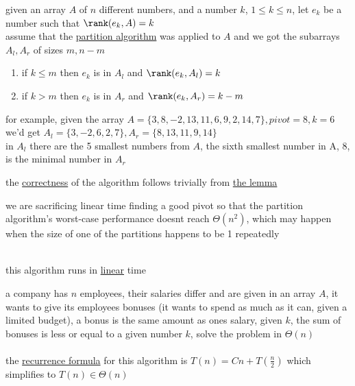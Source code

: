 \documentclass[a4paper,12pt]{article}
\begin{document}
\begin{lemma}
given an array \(A\) of \(n\) different numbers, and a number \(k\), \(1 \le k \le n\), let \(e_k\) be a number such that \(\rank(e_k,A)=k\)\\[0pt]
assume that the \href{20230202201612-partition_algorithm.org}{partition algorithm} was applied to \(A\) and we got the subarrays \(A_l,A_r\) of sizes \(m,n-m\)\\[0pt]
\begin{enumerate}
\item if \(k \le m\) then \(e_k\) is in \(A_l\) and \(\rank(e_k,A_l)=k\)\\[0pt]
\item if \(k>m\) then \(e_k\) is in \(A_r\) and \(\rank(e_k,A_r)=k-m\)\\[0pt]
\end{enumerate}
for example, given the array \(A=\{3,8,-2,13,11,6,9,2,14,7\},pivot=8,k=6\)\\[0pt]
we'd get \(A_l=\{3,-2,6,2,7\},A_r=\{8,13,11,9,14\}\)\\[0pt]
in \(A_l\) there are the 5 smallest numbers from \(A\), the sixth smallest number in A, 8, is the minimal number in \(A_r\)\\[0pt]
\label{orgec13148}
\end{lemma}
the \href{20221104220603-algorithm_correctness.org}{correctness} of the algorithm follows trivially from \hyperref[orgec13148]{the lemma}\\[0pt]
\begin{note}
we are sacrificing linear time finding a good pivot so that the partition algorithm's worst-case performance doesnt reach \(\Theta(n^2)\), which may happen when the size of one of the partitions happens to be 1 repeatedly\\[0pt]
\end{note}
\begin{my_example}
\\[0pt]

this algorithm runs in \href{calculus2.org}{linear} time\\[0pt]
\end{my_example}
\begin{my_example}
a company has \(n\) employees, their salaries differ and are given in an array \(A\), it wants to give its employees bonuses (it wants to spend as much as it can, given a limited budget), a bonus is the same amount as ones salary, given \(k\), the sum of bonuses is less or equal to a given number \(k\), solve the problem in \(\Theta(n)\)\\[0pt]
\\[0pt]

the \href{20230207143351-recurrence_relation.org}{recurrence formula} for this algorithm is \(T(n)=Cn+T\left(\frac{n}{2}\right)\) which simplifies to \(T(n) \in \Theta(n)\)\\[0pt]
\label{org3845f72}
\end{my_example}
\end{document}
